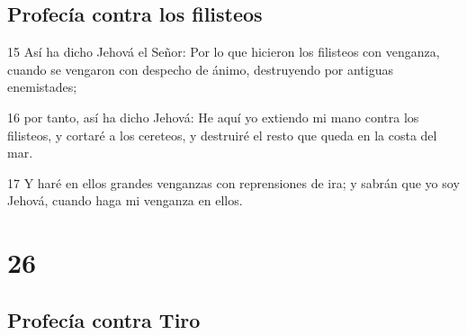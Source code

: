 \section*{Profecía contra los filisteos}

\par 15 Así ha dicho Jehová el Señor: Por lo que hicieron los filisteos con venganza, cuando se vengaron con despecho de ánimo, destruyendo por antiguas enemistades;
\par 16 por tanto, así ha dicho Jehová: He aquí yo extiendo mi mano contra los filisteos, y cortaré a los cereteos, y destruiré el resto que queda en la costa del mar.
\par 17 Y haré en ellos grandes venganzas con reprensiones de ira; y sabrán que yo soy Jehová, cuando haga mi venganza en ellos.

\chapter{26}

\section*{Profecía contra Tiro}

